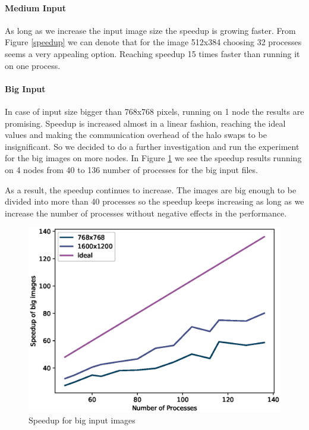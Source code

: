 \documentclass[12pt,a4paper]{article}
\begin{document}
          \paragraph{Medium Input}
            As long as we increase the input image size the speedup is growing faster. From Figure \ref{speedup} we can denote that for the image 512x384 choosing 32 processes seems a very appealing option. Reaching speedup 15 times faster than running it on one process.

          \paragraph{Big Input}

        	In case of input size bigger than 768x768 pixels, running on 1 node the results are promising. Speedup is increased almost in a linear fashion, reaching the ideal values and making the communication overhead of the halo swaps to be insignificant. So we decided to do a further investigation and run the experiment for the big images on more nodes. In Figure \ref{speedupBigInput} we see the speedup results running on 4 nodes from 40 to 136 number of processes for the big input files.

			As a result, the speedup continues to increase. The images are big enough to be divided into more than 40 processes so the speedup keeps increasing as long as we increase the number of processes without negative effects in the performance.
        	
        	\begin{figure}[ht]
        		\centering
        		\includegraphics[scale=0.8]{../graphs/speedupBigInput.eps}
        		\caption{Speedup for big input images}
        		\label{speedupBigInput}
        	\end{figure}
\end{document}
